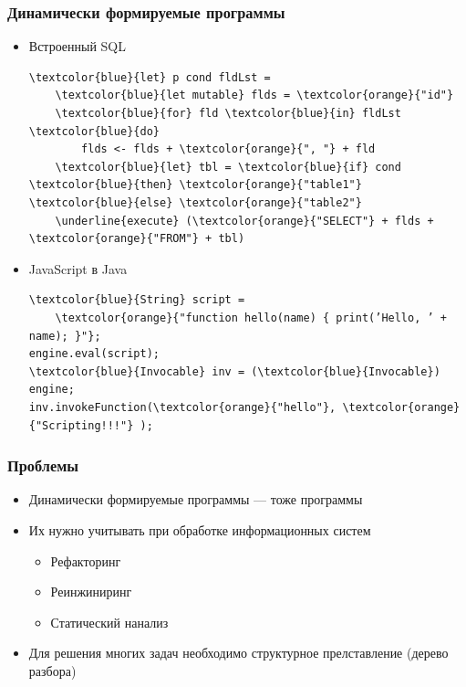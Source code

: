 \documentclass{beamer}
\begin{document}
\begin{frame}[fragile]
    \transwipe[direction=90]
    \frametitle{Динамически формируемые программы}
    \begin{itemize}
        \item Встроенный SQL
\begin{Verbatim}[commandchars=\\\{\}]
\textcolor{blue}{let} p cond fldLst =
    \textcolor{blue}{let mutable} flds = \textcolor{orange}{"id"}
    \textcolor{blue}{for} fld \textcolor{blue}{in} fldLst \textcolor{blue}{do}
        flds <- flds + \textcolor{orange}{", "} + fld 
    \textcolor{blue}{let} tbl = \textcolor{blue}{if} cond \textcolor{blue}{then} \textcolor{orange}{"table1"} \textcolor{blue}{else} \textcolor{orange}{"table2"}    
    \underline{execute} (\textcolor{orange}{"SELECT"} + flds + \textcolor{orange}{"FROM"} + tbl)
\end{Verbatim}
        \item JavaScript в Java
\begin{Verbatim}[commandchars=\\\{\}]
\textcolor{blue}{String} script =
    \textcolor{orange}{"function hello(name) { print(’Hello, ’ + name); }"};
engine.eval(script);
\textcolor{blue}{Invocable} inv = (\textcolor{blue}{Invocable}) engine;
inv.invokeFunction(\textcolor{orange}{"hello"}, \textcolor{orange}{"Scripting!!!"} );
\end{Verbatim}
    \end{itemize}

\end{frame}

\begin{frame}
    \transwipe[direction=90]
    \frametitle{Проблемы}
    \begin{itemize}
        \item Динамически формируемые программы --- тоже программы 
        \item Их нужно учитывать при обработке информационных систем
        \begin{itemize}
            \item Рефакторинг
            \item Реинжиниринг
            \item Статический нанализ
        \end{itemize}
        \item Для решения многих задач необходимо структурное прелставление (дерево разбора)
    \end{itemize}
\end{frame}
\end{document}
